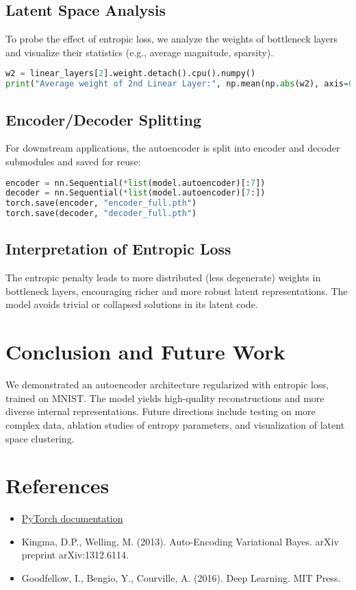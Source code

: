 \documentclass[12pt]{article}
\begin{document}
\subsection{Latent Space Analysis}
To probe the effect of entropic loss, we analyze the weights of bottleneck layers and visualize their statistics (e.g., average magnitude, sparsity).

\begin{lstlisting}[language=Python,caption={Extracting and Printing Weights}]
w2 = linear_layers[2].weight.detach().cpu().numpy()
print("Average weight of 2nd Linear Layer:", np.mean(np.abs(w2), axis=0))
\end{lstlisting}

\subsection{Encoder/Decoder Splitting}
For downstream applications, the autoencoder is split into encoder and decoder submodules and saved for reuse:
\begin{lstlisting}[language=Python,caption={Splitting and Saving}]
encoder = nn.Sequential(*list(model.autoencoder)[:7])
decoder = nn.Sequential(*list(model.autoencoder)[7:])
torch.save(encoder, "encoder_full.pth")
torch.save(decoder, "decoder_full.pth")
\end{lstlisting}

\subsection{Interpretation of Entropic Loss}
The entropic penalty leads to more distributed (less degenerate) weights in bottleneck layers, encouraging richer and more robust latent representations. The model avoids trivial or collapsed solutions in its latent code.

\section{Conclusion and Future Work}
We demonstrated an autoencoder architecture regularized with entropic loss, trained on MNIST. The model yields high-quality reconstructions and more diverse internal representations. Future directions include testing on more complex data, ablation studies of entropy parameters, and visualization of latent space clustering.

\section{References}
\begin{itemize}
    \item \href{https://pytorch.org}{PyTorch documentation}
    \item Kingma, D.P., Welling, M. (2013). Auto-Encoding Variational Bayes. arXiv preprint arXiv:1312.6114.
    \item Goodfellow, I., Bengio, Y., Courville, A. (2016). Deep Learning. MIT Press.
\end{itemize}
\end{document}
